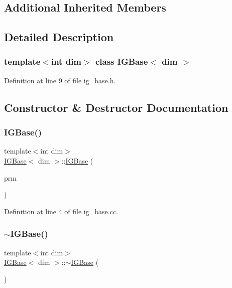 \subsection*{Additional Inherited Members}


\subsection{Detailed Description}
\subsubsection*{template$<$int dim$>$\newline
class I\+G\+Base$<$ dim $>$}



Definition at line 9 of file ig\+\_\+base.\+h.



\subsection{Constructor \& Destructor Documentation}
\mbox{\label{class_i_g_base_a50fb50b4a31894ddf7957f5bed6d74e7}} 
\subsubsection{\texorpdfstring{I\+G\+Base()}{IGBase()}}
{\footnotesize\ttfamily template$<$int dim$>$ \\
\hyperlink{class_i_g_base}{I\+G\+Base}$<$ dim $>$\+::\hyperlink{class_i_g_base}{I\+G\+Base} (\begin{DoxyParamCaption}\item[{const Parameter\+Handler \&}]{prm }\end{DoxyParamCaption})}



Definition at line 4 of file ig\+\_\+base.\+cc.

\mbox{\label{class_i_g_base_abde968ae9031dd55de0193896a0134b9}} 
\subsubsection{\texorpdfstring{$\sim$\+I\+G\+Base()}{~IGBase()}}
{\footnotesize\ttfamily template$<$int dim$>$ \\
\hyperlink{class_i_g_base}{I\+G\+Base}$<$ dim $>$\+::$\sim$\hyperlink{class_i_g_base}{I\+G\+Base} (\begin{DoxyParamCaption}{ }\end{DoxyParamCaption})\hspace{0.3cm}{\ttfamily [virtual]}}



